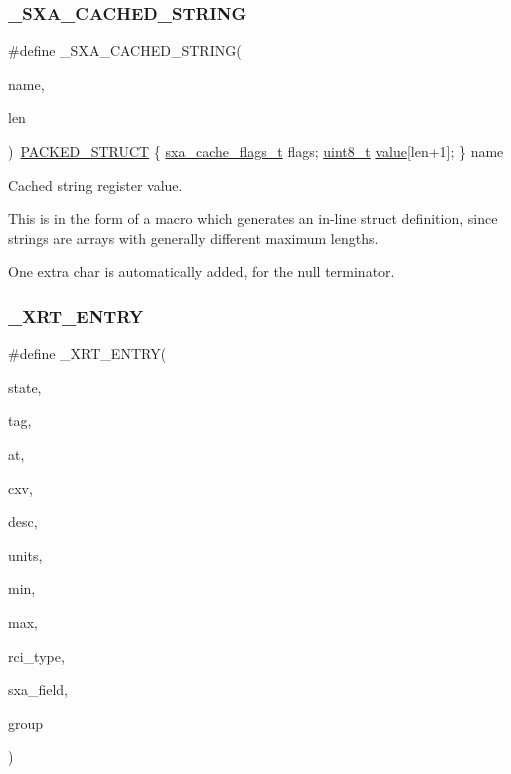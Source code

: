 \subsubsection{\texorpdfstring{\+\_\+\+S\+X\+A\+\_\+\+C\+A\+C\+H\+E\+D\+\_\+\+S\+T\+R\+I\+NG}{\_SXA\_CACHED\_STRING}}
{\footnotesize\ttfamily \#define \+\_\+\+S\+X\+A\+\_\+\+C\+A\+C\+H\+E\+D\+\_\+\+S\+T\+R\+I\+NG(\begin{DoxyParamCaption}\item[{}]{name,  }\item[{}]{len }\end{DoxyParamCaption})~\hyperlink{group___s_x_a_ga4233297bd31be5c273d4fb0758cc54d7}{P\+A\+C\+K\+E\+D\+\_\+\+S\+T\+R\+U\+CT} \{ \hyperlink{group___s_x_a_ga21b45e50d83fcc1363c4239313e88c06}{sxa\+\_\+cache\+\_\+flags\+\_\+t} flags; \hyperlink{group__hal__dos_gae1affc9ca37cfb624959c866a73f83c2}{uint8\+\_\+t} \hyperlink{group__zcl_ga1ed5b151a90f7e99af8cca2e6875ddf4}{value}\mbox{[}len+1\mbox{]}; \} name}



Cached string register value. 

This is in the form of a macro which generates an in-\/line struct definition, since strings are arrays with generally different maximum lengths.

One extra char is automatically added, for the null terminator. \mbox{\label{group___s_x_a_ga83cec2028c202eb87ad7bd5500949b24}} 
\subsubsection{\texorpdfstring{\+\_\+\+X\+R\+T\+\_\+\+E\+N\+T\+RY}{\_XRT\_ENTRY}}
{\footnotesize\ttfamily \#define \+\_\+\+X\+R\+T\+\_\+\+E\+N\+T\+RY(\begin{DoxyParamCaption}\item[{}]{state,  }\item[{}]{tag,  }\item[{}]{at,  }\item[{}]{cxv,  }\item[{}]{desc,  }\item[{}]{units,  }\item[{}]{min,  }\item[{}]{max,  }\item[{}]{rci\+\_\+type,  }\item[{}]{sxa\+\_\+field,  }\item[{}]{group }\end{DoxyParamCaption})}


